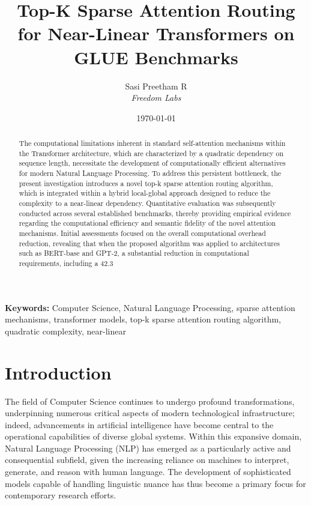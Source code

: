 \documentclass[12pt]{article}
\title{Top-K Sparse Attention Routing for Near-Linear Transformers on GLUE Benchmarks}
\author{Sasi Preetham R \\
\textit{Freedom Labs}}
\date{\today}
\begin{document}
\maketitle

\begin{abstract}
The computational limitations inherent in standard self-attention mechanisms within the Transformer architecture, which are characterized by a quadratic dependency on sequence length, necessitate the development of computationally efficient alternatives for modern Natural Language Processing. To address this persistent bottleneck, the present investigation introduces a novel top-k sparse attention routing algorithm, which is integrated within a hybrid local-global approach designed to reduce the complexity to a near-linear dependency. Quantitative evaluation was subsequently conducted across several established benchmarks, thereby providing empirical evidence regarding the computational efficiency and semantic fidelity of the novel attention mechanisms. Initial assessments focused on the overall computational overhead reduction, revealing that when the proposed algorithm was applied to architectures such as BERT-base and GPT-2, a substantial reduction in computational requirements, including a 42.3%
\end{abstract}

\textbf{Keywords:} Computer Science, Natural Language Processing, sparse attention mechanisms, transformer models, top-k sparse attention routing algorithm, quadratic complexity, near-linear

\section{Introduction}
The field of Computer Science continues to undergo profound transformations, underpinning numerous critical aspects of modern technological infrastructure; indeed, advancements in artificial intelligence have become central to the operational capabilities of diverse global systems. Within this expansive domain, Natural Language Processing (NLP) has emerged as a particularly active and consequential subfield, given the increasing reliance on machines to interpret, generate, and reason with human language. The development of sophisticated models capable of handling linguistic nuance has thus become a primary focus for contemporary research efforts.
\end{document}
